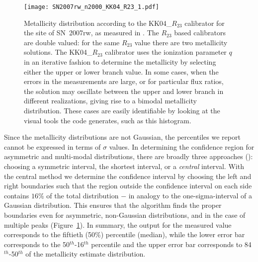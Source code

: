 \documentclass{emulateapj} \usepackage{amsmath} \usepackage{float}
\begin{document}
\begin{figure}[ht!]
\texttt{[image: SN2007rw\_n2000\_KK04\_R23\_1.pdf]}
\caption{Metallicity distribution according to the KK04\_$R_{23}$
  calibrator for the site of SN~2007rw, as measured in
  \citet{modjaz11}. The $R_{23}$ based calibrators are double valued:
  for the same $R_{23}$ value there are two metallicity solutions. The
  KK04\_$R_{23}$ calibrator uses the ionization parameter $q$ in an
  iterative fashion to determine the metallicity by selecting either
  the upper or lower branch value. In some cases, when the errors in
  the measurements are large, or for particular flux ratios, the
  solution may oscillate between the upper and lower branch in
  different realizations, giving rise to a bimodal metallicity
  distribution. These cases are easily identifiable by looking at the
  visual tools the code generates, such as this
  histogram.}\label{metallicity_bimodal}
\end{figure}

Since the metallicity distributions are not Gaussian, the percentiles
we report cannot be expressed in terms of $\sigma$ values. In
determining the confidence region for asymmetric and multi-modal
distributions, there are broadly three approaches (\citealt{andrae10}): choosing a symmetric interval, the shortest
interval, or a \emph{central} interval.  With the central method we
determine the confidence interval by choosing the left and right
boundaries such that the region outside the confidence interval on
each side contains $16\%$ of the total distribution $-$ in analogy to
the one-sigma-interval of a Gaussian distribution. This ensures that
the algorithm finds the proper boundaries even for asymmetric,
non-Gaussian distributions, and in the case of multiple peaks
(Figure~\ref{metallicity_bimodal}). In summary, the output for the
measured value corresponds to the fiftieth (50\%) percentile (median),
while the lower error bar corresponds to the 50$^{th}$-16$^{th}$
percentile and the upper error bar corresponds to 84$^{th}$-50$^{th}$
of the metallicity estimate distribution.
\end{document}

